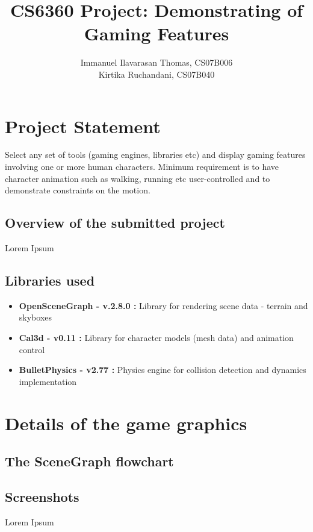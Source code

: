 \documentclass[a4paper]{article}
\title{\color{db} \textbf{CS6360 Project: Demonstrating of Gaming Features}}
\author{Immanuel Ilavarasan Thomas, CS07B006 \\  Kirtika Ruchandani, CS07B040}
\begin{document}
\sffamily
\maketitle



\section*{\color{db}Project Statement}
Select any set of tools (gaming engines, libraries etc) and display gaming
features involving one or more human characters. Minimum requirement is to have 
character animation such as walking, running etc user-controlled and to
demonstrate constraints on the motion. 

\subsection*{\color{db}Overview of the submitted project}
Lorem Ipsum

\subsection*{\color{db}Libraries used}
\begin{itemize}
\item \textbf{OpenSceneGraph - v.2.8.0 : } Library for rendering scene data - terrain and skyboxes 
\item \textbf{Cal3d - v0.11 : } Library for character models (mesh data) and animation control
\item \textbf{BulletPhysics - v2.77 : } Physics engine for collision detection and dynamics implementation
\end{itemize}

\section*{Details of the game graphics}
\subsection*{The SceneGraph flowchart}
\subsection*{Screenshots}
Lorem Ipsum
\end{document}
